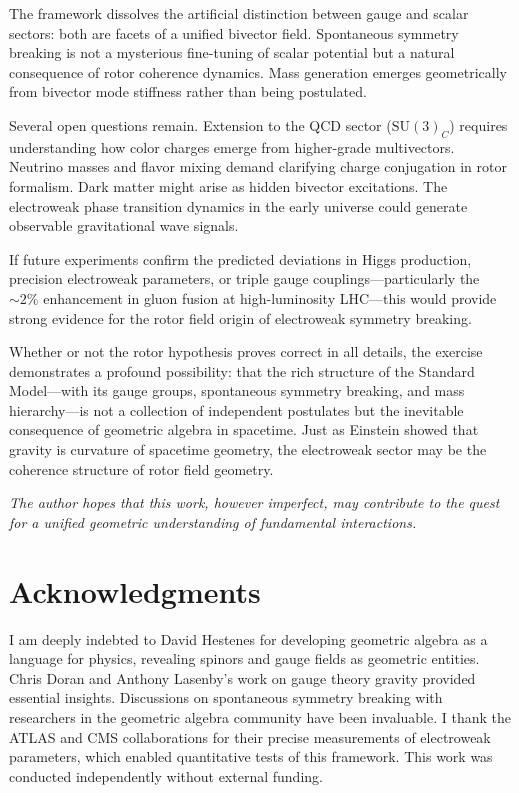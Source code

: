 \documentclass[11pt,a4paper]{article}
\newcommand{\SU}{\mathrm{SU}}
\theoremstyle{definition}
\theoremstyle{plain}
\theoremstyle{remark}
\begin{document}
The framework dissolves the artificial distinction between gauge and scalar sectors: both are facets of a unified bivector field. Spontaneous symmetry breaking is not a mysterious fine-tuning of scalar potential but a natural consequence of rotor coherence dynamics. Mass generation emerges geometrically from bivector mode stiffness rather than being postulated.

Several open questions remain. Extension to the QCD sector ($\SU(3)_C$) requires understanding how color charges emerge from higher-grade multivectors. Neutrino masses and flavor mixing demand clarifying charge conjugation in rotor formalism. Dark matter might arise as hidden bivector excitations. The electroweak phase transition dynamics in the early universe could generate observable gravitational wave signals.

If future experiments confirm the predicted deviations in Higgs production, precision electroweak parameters, or triple gauge couplings---particularly the $\sim 2\%$ enhancement in gluon fusion at high-luminosity LHC---this would provide strong evidence for the rotor field origin of electroweak symmetry breaking.

Whether or not the rotor hypothesis proves correct in all details, the exercise demonstrates a profound possibility: that the rich structure of the Standard Model---with its gauge groups, spontaneous symmetry breaking, and mass hierarchy---is not a collection of independent postulates but the inevitable consequence of geometric algebra in spacetime. Just as Einstein showed that gravity is curvature of spacetime geometry, the electroweak sector may be the coherence structure of rotor field geometry.

\medskip
\noindent\textit{The author hopes that this work, however imperfect, may contribute to the quest for a unified geometric understanding of fundamental interactions.}

\vspace{1em}

\section*{Acknowledgments}

I am deeply indebted to David Hestenes for developing geometric algebra as a language for physics, revealing spinors and gauge fields as geometric entities. Chris Doran and Anthony Lasenby's work on gauge theory gravity provided essential insights. Discussions on spontaneous symmetry breaking with researchers in the geometric algebra community have been invaluable. I thank the ATLAS and CMS collaborations for their precise measurements of electroweak parameters, which enabled quantitative tests of this framework. This work was conducted independently without external funding.
\end{document}
